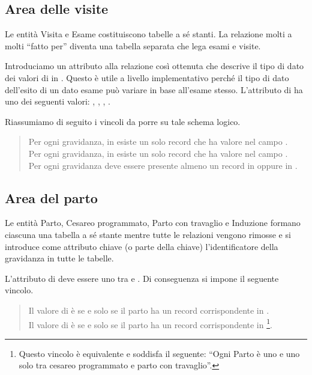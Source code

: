 \subsection{Area delle visite}

Le entità Visita e Esame costituiscono tabelle a sé stanti. La relazione molti a molti \enquote{fatto per} diventa una tabella separata che lega esami e visite.

Introduciamo un attributo  alla relazione  così ottenuta che descrive il tipo di dato dei valori di  in .
Questo è utile a livello implementativo perché il tipo di dato dell'esito di un dato esame può variare in base all'esame stesso.
L'attributo  di  ha uno dei seguenti valori: , , , .

Riassumiamo di seguito i vincoli da porre su tale schema logico.
\begin{quote}
Per ogni gravidanza, in  esiste un solo record che ha valore  nel campo . \\
Per ogni gravidanza, in  esiste un solo record che ha valore  nel campo . \\
Per ogni gravidanza deve essere presente almeno un record in  oppure in .
\end{quote}

\subsection{Area del parto}

Le entità Parto, Cesareo programmato, Parto con travaglio e Induzione formano ciascuna una tabella a sé stante mentre tutte le relazioni vengono rimosse e si introduce come attributo chiave (o parte della chiave) l'identificatore della gravidanza in tutte le tabelle.

L'attributo  di  deve essere uno tra  e .
Di conseguenza si impone il seguente vincolo.
\begin{quote}
Il valore di  è  se e solo se il parto ha un record corrispondente in . \\
Il valore di  è  se e solo se il parto ha un record corrispondente in \footnote{
    Questo vincolo è equivalente e soddisfa il seguente: \enquote{Ogni Parto è uno e uno solo tra cesareo programmato e parto con travaglio}.
}.
\end{quote}

